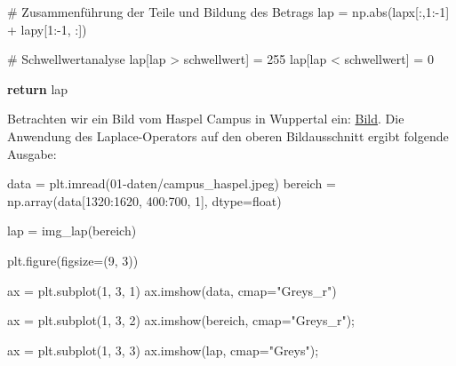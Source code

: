 \documentclass[
  letterpaper,
  DIV=11,
  numbers=noendperiod]{scrreprt}
\newenvironment{Shaded}{\begin{snugshade}}{\end{snugshade}}
\newcommand{\BuiltInTok}[1]{\textcolor[rgb]{0.00,0.23,0.31}{#1}}
\newcommand{\CommentTok}[1]{\textcolor[rgb]{0.37,0.37,0.37}{#1}}
\newcommand{\ControlFlowTok}[1]{\textcolor[rgb]{0.00,0.23,0.31}{\textbf{#1}}}
\newcommand{\DecValTok}[1]{\textcolor[rgb]{0.68,0.00,0.00}{#1}}
\newcommand{\NormalTok}[1]{\textcolor[rgb]{0.00,0.23,0.31}{#1}}
\newcommand{\OperatorTok}[1]{\textcolor[rgb]{0.37,0.37,0.37}{#1}}
\newcommand{\StringTok}[1]{\textcolor[rgb]{0.13,0.47,0.30}{#1}}
\begin{document}
\begin{tcolorbox}
\begin{Shaded}
\begin{Highlighting}[]
    \CommentTok{\# Zusammenführung der Teile und Bildung des Betrags}
\NormalTok{    lap }\OperatorTok{=}\NormalTok{ np.}\BuiltInTok{abs}\NormalTok{(lapx[:,}\DecValTok{1}\NormalTok{:}\OperatorTok{{-}}\DecValTok{1}\NormalTok{] }\OperatorTok{+}\NormalTok{ lapy[}\DecValTok{1}\NormalTok{:}\OperatorTok{{-}}\DecValTok{1}\NormalTok{, :])}
    
    \CommentTok{\# Schwellwertanalyse}
\NormalTok{    lap[lap }\OperatorTok{\textgreater{}}\NormalTok{ schwellwert] }\OperatorTok{=} \DecValTok{255}
\NormalTok{    lap[lap }\OperatorTok{\textless{}}\NormalTok{ schwellwert] }\OperatorTok{=} \DecValTok{0}
    
    \ControlFlowTok{return}\NormalTok{ lap}
\end{Highlighting}
\end{Shaded}

Betrachten wir ein Bild vom Haspel Campus in Wuppertal ein:
\href{https://firedynamics.github.io/LectureComputerScience/_downloads/592f1fc843fc7c01bdcad17bf85ec15c/campus_haspel.jpeg}{Bild}.
Die Anwendung des Laplace-Operators auf den oberen Bildausschnitt ergibt
folgende Ausgabe:

\begin{Shaded}
\begin{Highlighting}[]
\NormalTok{data }\OperatorTok{=}\NormalTok{ plt.imread(}\StringTok{\textquotesingle{}01{-}daten/campus\_haspel.jpeg\textquotesingle{}}\NormalTok{)}
\NormalTok{bereich }\OperatorTok{=}\NormalTok{ np.array(data[}\DecValTok{1320}\NormalTok{:}\DecValTok{1620}\NormalTok{, }\DecValTok{400}\NormalTok{:}\DecValTok{700}\NormalTok{, }\DecValTok{1}\NormalTok{], dtype}\OperatorTok{=}\BuiltInTok{float}\NormalTok{)}

\NormalTok{lap }\OperatorTok{=}\NormalTok{ img\_lap(bereich)}

\NormalTok{plt.figure(figsize}\OperatorTok{=}\NormalTok{(}\DecValTok{9}\NormalTok{, }\DecValTok{3}\NormalTok{))}

\NormalTok{ax }\OperatorTok{=}\NormalTok{ plt.subplot(}\DecValTok{1}\NormalTok{, }\DecValTok{3}\NormalTok{, }\DecValTok{1}\NormalTok{)}
\NormalTok{ax.imshow(data, cmap}\OperatorTok{=}\StringTok{"Greys\_r"}\NormalTok{)}

\NormalTok{ax }\OperatorTok{=}\NormalTok{ plt.subplot(}\DecValTok{1}\NormalTok{, }\DecValTok{3}\NormalTok{, }\DecValTok{2}\NormalTok{)}
\NormalTok{ax.imshow(bereich, cmap}\OperatorTok{=}\StringTok{"Greys\_r"}\NormalTok{)}\OperatorTok{;}

\NormalTok{ax }\OperatorTok{=}\NormalTok{ plt.subplot(}\DecValTok{1}\NormalTok{, }\DecValTok{3}\NormalTok{, }\DecValTok{3}\NormalTok{)}
\NormalTok{ax.imshow(lap, cmap}\OperatorTok{=}\StringTok{"Greys"}\NormalTok{)}\OperatorTok{;}
\end{Highlighting}
\end{Shaded}


\end{tcolorbox}
\end{document}
